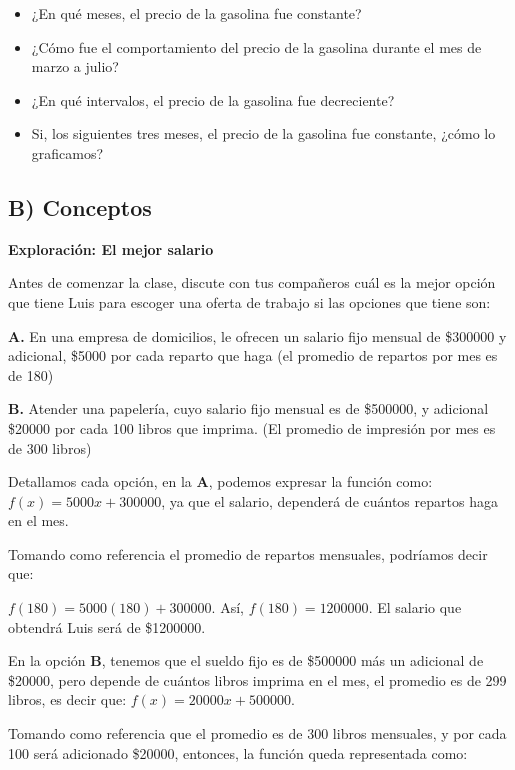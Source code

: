\documentclass[12pt,a4paper]{article}
\begin{document}
\begin{itemize}
\item ¿En qué meses, el precio de la gasolina fue constante?
\item ¿Cómo fue el comportamiento del precio de la gasolina durante el mes de marzo a julio?
\item ¿En qué intervalos, el precio de la gasolina fue decreciente?
\item Si, los siguientes tres meses, el precio de la gasolina fue constante, ¿cómo lo graficamos?
\end{itemize}

\subsection*{B) Conceptos}

\textbf{Exploración: El mejor salario}

Antes de comenzar la clase, discute con tus compañeros cuál es la mejor opción que tiene Luis para escoger una oferta de trabajo si las opciones que tiene son:

\textbf{A.} En una empresa de domicilios, le ofrecen un salario fijo mensual de \$300000 y adicional, \$5000 por cada reparto que haga (el promedio de repartos por mes es de 180)

\textbf{B.} Atender una papelería, cuyo salario fijo mensual es de \$500000, y adicional \$20000 por cada 100 libros que imprima. (El promedio de impresión por mes es de 300 libros)

\vspace{0.5cm}

Detallamos cada opción, en la \textbf{A}, podemos expresar la función como: $f(x) = 5000x + 300000$, ya que el salario, dependerá de cuántos repartos haga en el mes.

Tomando como referencia el promedio de repartos mensuales, podríamos decir que:

$f(180) = 5000(180) + 300000$. Así, $f(180) = 1200000$. El salario que obtendrá Luis será de \$1200000.

En la opción \textbf{B}, tenemos que el sueldo fijo es de \$500000 más un adicional de \$20000, pero depende de cuántos libros imprima en el mes, el promedio es de 299 libros, es decir que: $f(x) = 20000x + 500000$.

Tomando como referencia que el promedio es de 300 libros mensuales, y por cada 100 será adicionado \$20000, entonces, la función queda representada como:
\end{document}
